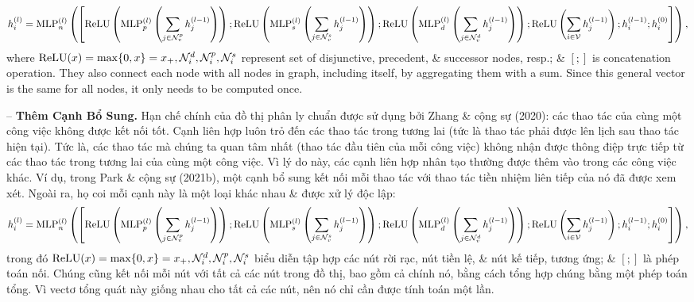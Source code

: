 \documentclass{article}
\begin{document}
\begin{itemize}
\begin{itemize}
\begin{itemize}
            \begin{equation*}
                h_i^{(l)} = {\rm MLP}_n^{(l)}\left(\left[{\rm ReLU}\left({\rm MLP}_p^{(l)}\left(\sum_{j\in{\cal N}_v^p} h_j^{(l-1)}\right)\right);{\rm ReLU}\left({\rm MLP}_s^{(l)}\left(\sum_{j\in{\cal N}_v^s} h_j^{(l-1)}\right)\right);{\rm ReLU}\left({\rm MLP}_d^{(l)}\left(\sum_{j\in{\cal N}_v^d} h_j^{(l-1)}\right)\right);{\rm ReLU}\left(\sum_{i\in{\cal V}} h_j^{(l-1)}\right);h_i^{(l-1)};h_i^{(0)}\right]\right),
            \end{equation*}
            where ${\rm ReLU}(x) = \max\{0,x\} = x_+,{\cal N}_i^d,{\cal N}_i^p,{\cal N}_i^s$ represent set of disjunctive, precedent, \& successor nodes, resp.; \& $[;]$ is concatenation operation. They also connect each node with all nodes in graph, including itself, by aggregating them with a sum. Since this general vector is the same for all nodes, it only needs to be computed once.

            -- {\bf Thêm Cạnh Bổ Sung.} Hạn chế chính của đồ thị phân ly chuẩn được sử dụng bởi Zhang \& cộng sự (2020): các thao tác của cùng một công việc không được kết nối tốt. Cạnh liên hợp luôn trỏ đến các thao tác trong tương lai (tức là thao tác phải được lên lịch sau thao tác hiện tại). Tức là, các thao tác mà chúng ta quan tâm nhất (thao tác đầu tiên của mỗi công việc) không nhận được thông điệp trực tiếp từ các thao tác trong tương lai của cùng một công việc. Vì lý do này, các cạnh liên hợp nhân tạo thường được thêm vào trong các công việc khác. Ví dụ, trong Park \& cộng sự (2021b), một cạnh bổ sung kết nối mỗi thao tác với thao tác tiền nhiệm liên tiếp của nó đã được xem xét. Ngoài ra, họ coi mỗi cạnh này là một loại khác nhau \& được xử lý độc lập:
            \begin{equation*}
                h_i^{(l)} = {\rm MLP}_n^{(l)}\left(\left[{\rm ReLU}\left({\rm MLP}_p^{(l)}\left(\sum_{j\in{\cal N}_v^p} h_j^{(l-1)}\right)\right);{\rm ReLU}\left({\rm MLP}_s^{(l)}\left(\sum_{j\in{\cal N}_v^s} h_j^{(l-1)}\right)\right);{\rm ReLU}\left({\rm MLP}_d^{(l)}\left(\sum_{j\in{\cal N}_v^d} h_j^{(l-1)}\right)\right);{\rm ReLU}\left(\sum_{i\in{\cal V}} h_j^{(l-1)}\right);h_i^{(l-1)};h_i^{(0)}\right]\right),
            \end{equation*}
            trong đó ${\rm ReLU}(x) = \max\{0,x\} = x_+,{\cal N}_i^d,{\cal N}_i^p,{\cal N}_i^s$ biểu diễn tập hợp các nút rời rạc, nút tiền lệ, \& nút kế tiếp, tương ứng; \& $[;]$ là phép toán nối. Chúng cũng kết nối mỗi nút với tất cả các nút trong đồ thị, bao gồm cả chính nó, bằng cách tổng hợp chúng bằng một phép toán tổng. Vì vectơ tổng quát này giống nhau cho tất cả các nút, nên nó chỉ cần được tính toán một lần.


\end{itemize}
\end{itemize}
\end{itemize}
\end{document}
